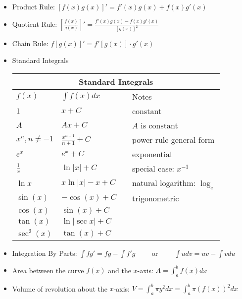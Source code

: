 \begin{itemize}
	\item Product Rule: $[f(x)g(x)]' = f'(x)g(x) + f(x)g'(x)$
	\item Quotient Rule: $\displaystyle \left[\frac{f(x)}{g(x)}\right]' = \frac{f'(x)g(x) - f(x)g'(x)}{[g(x)]^2}$
	\item Chain Rule: $f[g(x)]' = f'[g(x)] \cdot g'(x)$
\clearpage	\item Standard Integrals
	\begin{center}
		\renewcommand{\arraystretch}{1.2}
		\begin{tabular}{llcl}
			\toprule
			\multicolumn{4}{c}{Standard Integrals}\\\midrule
			$f(x)$  &  $\int f(x)dx$&&Notes \\ \midrule
			$1$&$x+C$&&constant\\
			$A$&$Ax+C$&&$A$ is constant\\\midrule
			$x^n, n \neq -1$ & $\displaystyle\frac{x^{n+1}}{n+1}+C$&&power rule general form\\ 
			$e^x$ & $e^x+C$&&exponential\\ 
			$\frac{1}{x}$ & $\ln|x|+C$&&special case: $x^{-1}$\\
			$\ln x$&$x\ln |x|-x+C$&&natural logarithm: $\log_e$\\\midrule
			$\sin(x)$ & $-\cos(x)+C$&& trigonometric \\ 
			$\cos(x)$ & $\sin(x)+C$\\ 
			$\tan (x)$&$\ln |\sec x|+C$\\
			$\sec^2(x)$ & $\tan(x)+C$ \\ \bottomrule
		\end{tabular}
	\end{center}
	\item Integration By Parts: $\displaystyle \int fg' = fg-\int f'g \hspace{1cm} \text{or} \hspace{1cm} \int udv = uv - \int vdu$
	\item Area between the curve $f(x)$ and the $x$-axis: $\displaystyle A=\int_{a}^{b} f(x)dx$\\
	\item Volume of revolution about the $x$-axis:
	$\displaystyle V= \int_{a}^{b} \pi y^2 dx = \int_{a}^{b} \pi (f(x))^2 dx$
\end{itemize}
